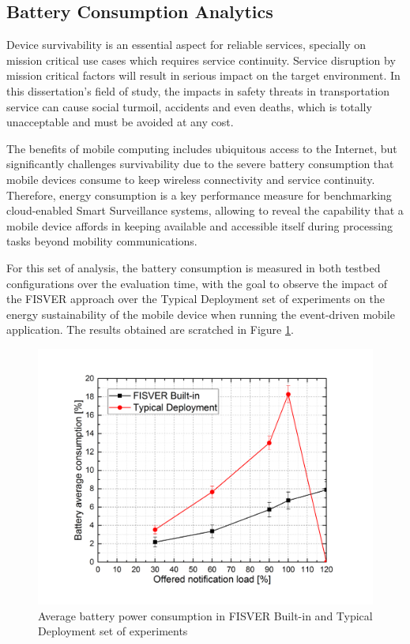 \subsection{Battery Consumption Analytics}
\label{BatAnalytics}

Device survivability is an essential aspect for reliable services, specially on mission critical use cases which requires service continuity. Service disruption by mission critical factors will result in serious impact on the target environment. In this dissertation's field of study, the impacts in safety threats in transportation service can cause social turmoil, accidents and even deaths, which is totally unacceptable and must be avoided at any cost.

The benefits of mobile computing includes ubiquitous access to the Internet, but significantly challenges survivability due to the severe battery consumption that mobile devices consume to keep wireless connectivity and service continuity. Therefore, energy consumption is a key performance measure for benchmarking cloud-enabled Smart Surveillance systems, allowing to reveal the capability that a mobile device affords in keeping available and accessible itself during processing tasks beyond mobility communications.

For this set of analysis, the battery consumption is measured in both testbed configurations over the evaluation time, with the goal to observe the impact of the FISVER approach over the Typical Deployment set of experiments on the energy sustainability of the mobile device when running the event-driven mobile application. The results obtained are scratched in Figure \ref{fig:result1}.

\begin{figure}[htb]
	\centering
 	\includegraphics[scale=0.60]{Imagens/cap5_bat.png}
 	\caption{Average battery power consumption in FISVER Built-in and Typical Deployment set of experiments}
 	\label{fig:result1}
\end{figure}

